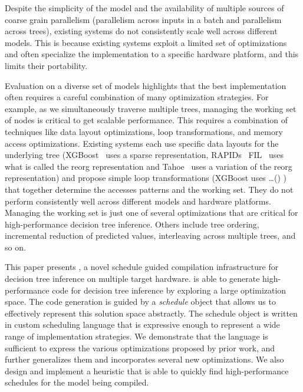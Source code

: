 Despite the simplicity of the model and the availability of multiple sources of coarse grain parallelism (parallelism across inputs in a batch and parallelism across trees), existing systems do not consistently scale well across different models. 
This is because existing systems exploit a limited set of optimizations and often specialize the implementation to a specific hardware platform, and this limits their portability. 

Evaluation on a diverse set of models highlights that the best implementation often requires a careful combination of many optimization strategies. For example, as we simultaneously traverse multiple trees, managing the working set of nodes is critical to get scalable performance. This requires a combination of techniques like data layout optimizations, loop transformations, and memory access optimizations. Existing systems each use specific data layouts for the underlying tree (XGBoost~\cite{XGBoost} uses a sparse representation, RAPIDs~\cite{Rapids} FIL~\cite{FTL} uses what is called the reorg representation 
and Tahoe~\cite{Tahoe} uses a variation of the reorg representation) and propose simple loop transformations (XGBoost uses \dots() ) that together determine the accesses patterns and the working set. They do not perform consistently well across different models and hardware platforms.
Managing the working set is just one of several optimizations that are critical for high-performance decision tree inference.
 Others include tree ordering,  incremental reduction of predicted values, interleaving across multiple trees, and so on.

This paper presents \Treebeard{}, a novel schedule guided compilation infrastructure for decision tree inference on multiple target hardware. \Treebeard{} is able to generate high-performance code for decision tree inference by exploring a large optimization space. The code generation is guided by a \emph{schedule} object that allows us to effectively represent this solution space abstractly. The schedule object is written in \Treebeard{} custom scheduling language that is expressive enough to represent a wide range of implementation strategies. We demonstrate that the language is sufficient to express the various optimizations proposed by prior work, and further generalizes them and incorporates several new optimizations. We also design and implement a heuristic that is able to quickly find high-performance schedules for the model being compiled.
